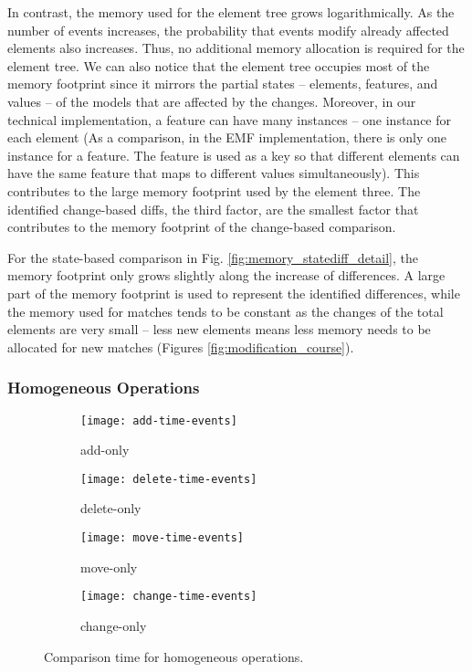 In contrast, the memory used for the element tree grows logarithmically. As the number of events increases, the probability that events modify already affected elements also increases. Thus, no additional memory allocation is required for the element tree. We can also notice that the element tree occupies most of the memory footprint since it mirrors the partial states -- elements, features, and values -- of the models that are affected by the changes. Moreover, in our technical implementation, a feature can have many instances -- one instance for each element (As a comparison, in the EMF implementation, there is only one instance for a feature. The feature is used as a key so that different elements can have the same feature that maps to different values simultaneously). This contributes to the large memory footprint used by the element three. The identified change-based diffs, the third factor, are the smallest factor that contributes to the memory footprint of the change-based comparison. 

For the state-based comparison in Fig. \ref{fig:memory_statediff_detail}, the memory footprint only grows slightly along the increase of differences. A large part of the memory footprint is used to represent the identified differences, while the memory used for matches tends to be constant as the changes of the total elements are very small -- less new elements means less memory needs to be allocated for new matches (Figures \ref{fig:modification_course}). 

\subsubsection{Homogeneous Operations}
\label{sec:homogeneous-operation}

\begin{figure*}[ht]
    \centering
    \begin{subfigure}[t]{0.245\linewidth}
        \texttt{[image: add-time-events]}
        \caption{add-only}
        \label{fig:add-time-events}
    \end{subfigure}
    \hfill
    \begin{subfigure}[t]{0.245\linewidth}
        \texttt{[image: delete-time-events]}
        \caption{delete-only}
        \label{fig:delete-time-events}
    \end{subfigure}
    \hfill
    \begin{subfigure}[t]{0.245\linewidth}
        \texttt{[image: move-time-events]}
        \caption{move-only}
        \label{fig:move-time-events}
    \end{subfigure}
    \hfill
    \begin{subfigure}[t]{0.245\linewidth}
        \texttt{[image: change-time-events]}
        \caption{change-only}
        \label{fig:change-time-events}
    \end{subfigure}
    \caption{Comparison time for homogeneous operations.}
    \label{fig:operation_time_events}
\end{figure*}

